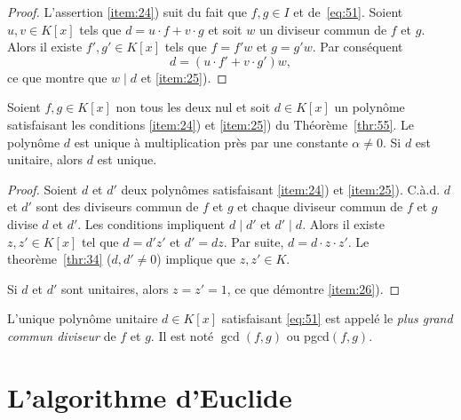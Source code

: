 \begin{proof}
  L'assertion \ref{item:24}) suit du fait que $f,g ∈ I$ et de~\eqref{eq:51}. Soient $u,v ∈K[x]$  tels que
  $    d = u⋅f  + v ⋅ g $
  et soit $w$ un diviseur commun de $f$ et $g$. Alors il existe $f',g' ∈K[x]$ tels que  $f = f' w$ et $g = g' w$. Par conséquent
  \begin{displaymath}
    d = (u⋅f'  + v ⋅ g') w,
  \end{displaymath}
  ce que montre que $w \mid d$ et \ref{item:25}).  
\end{proof}


\begin{proposition}
  \label{prop:9}
  Soient $f ,g ∈ K[x]$ non tous les deux nul et soit  $d ∈ K[x]$ un polynôme satisfaisant les conditions \ref{item:24}) et \ref{item:25}) du Théorème~\ref{thr:55}.  
  Le polynôme $d$ est unique à multiplication près par une constante $\alpha \neq 0$.  Si $d$ est unitaire, alors $d$ est unique.  \label{item:26}
\end{proposition}
\begin{proof}
  Soient $d$ et $d'$ deux polynômes  satisfaisant \ref{item:24}) et \ref{item:25}). C.à.d. $d$ et $d'$ sont des diviseurs commun de $f$ et $g$ et chaque diviseur commun de $f$ et $g$ divise $d$ et $d'$.
  Les conditions impliquent   $d \mid d'$ et $d' \mid d$. 
   Alors il existe $z,z' ∈K[x]$ tel que $d = d' z'$ et $d' = dz$. Par suite, $d = d ⋅z ⋅ z'$. Le theorème~\ref{thr:34} ($d,d' ≠0$) implique que $z,z' ∈ K$.

   \medskip
   
\noindent    
 Si  $d$ et $d'$ sont unitaires, alors  $z=z'=1$, ce que démontre \ref{item:26}). 
\end{proof}


\begin{definition}
  \label{def:56}
  L'unique polynôme unitaire $d ∈ K[x]$ satisfaisant \eqref{eq:51} est appelé  le \emph{plus grand commun diviseur} de $f$ et $g$. Il est noté $\gcd(f,g)$ ou pgcd$(f,g)$.
\end{definition}

\section{L'algorithme d'Euclide}
\label{sec:lalg-de-eucl}



